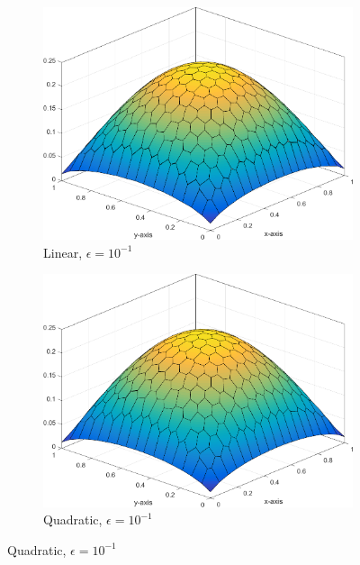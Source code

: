 \begin{figure}
\centering
{
	\begin{subfigure}[b]{0.465\textwidth}
		\centering
		\label{subfig::DL_trans_me1_e1}
		\includegraphics[width=\textwidth]{figures/sec_BF/Sq_poly_MAXENT_k=1_ep=1e-1.png}
		\caption{Linear, $\epsilon = 10^{-1}$}
	\end{subfigure}
	\hfill
	\begin{subfigure}[b]{0.465\textwidth}
		\centering
		\label{subfig::DL_trans_me2_e1}
		\includegraphics[width=\textwidth]{figures/sec_BF/Sq_poly_MAXENT_k=2_ep=1e-1.png}
		\caption{Quadratic, $\epsilon = 10^{-1}$}
	\end{subfigure}
}
{
	\vspace{3mm}
}
\end{figure}
